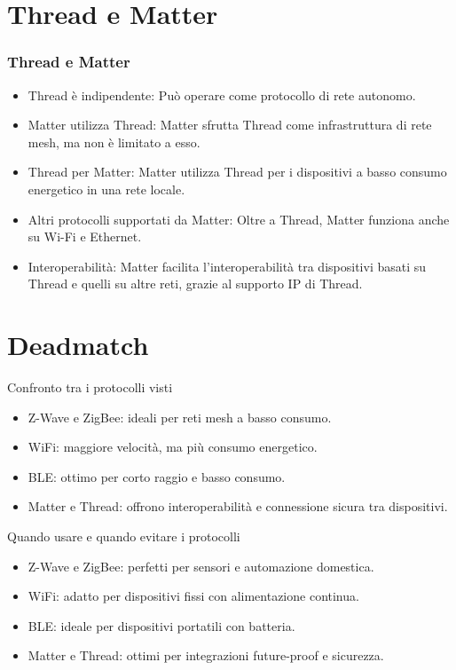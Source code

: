 \documentclass{beamer}
\begin{document}
\section{Thread e Matter}
\begin{frame}
	\frametitle{Thread e Matter}
	\begin{itemize}
		\item Thread è indipendente: Può operare come protocollo di rete autonomo.
		\item Matter utilizza Thread: Matter sfrutta Thread come infrastruttura di rete mesh, ma non è limitato a esso.
		\item Thread per Matter: Matter utilizza Thread per i dispositivi a basso consumo energetico in una rete locale.
		\item Altri protocolli supportati da Matter: Oltre a Thread, Matter funziona anche su Wi-Fi e Ethernet.
		\item Interoperabilità: Matter facilita l'interoperabilità tra dispositivi basati su Thread e quelli su altre reti, grazie al supporto IP di Thread.
	\end{itemize}
\end{frame}
	\section{Deadmatch}
	
	\begin{frame}{Confronto tra i protocolli visti}
		\begin{itemize}
			\item Z-Wave e ZigBee: ideali per reti mesh a basso consumo.
			\item WiFi: maggiore velocità, ma più consumo energetico.
			\item BLE: ottimo per corto raggio e basso consumo.
			\item Matter e Thread: offrono interoperabilità e connessione sicura tra dispositivi.
		\end{itemize}
	\end{frame}
	
	\begin{frame}{Quando usare e quando evitare i protocolli}
		\begin{itemize}
			\item Z-Wave e ZigBee: perfetti per sensori e automazione domestica.
			\item WiFi: adatto per dispositivi fissi con alimentazione continua.
			\item BLE: ideale per dispositivi portatili con batteria.
			\item Matter e Thread: ottimi per integrazioni future-proof e sicurezza.
		\end{itemize}
	\end{frame}
	
\end{document}
